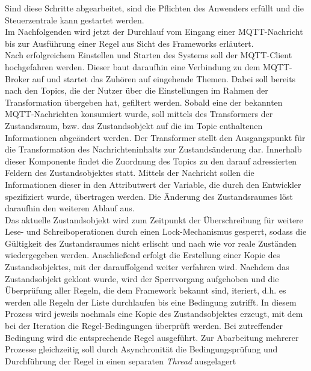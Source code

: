         Sind diese Schritte abgearbeitet, sind die Pflichten des Anwenders erfüllt und die Steuerzentrale kann gestartet werden. 
        \\
        Im Nachfolgenden wird jetzt der Durchlauf vom Eingang einer \acs{MQTT}-Nachricht bis zur Ausführung einer Regel aus Sicht des Frameworks 
        erläutert.
        \\
        \linebreak
        Nach erfolgreichem Einstellen und Starten des Systems soll der \acs{MQTT}-Client hochgefahren werden. Dieser baut daraufhin eine 
        Verbindung zu dem \acs{MQTT}-Broker auf und startet das Zuhören auf eingehende Themen. Dabei soll bereits nach den Topics,  
        die der Nutzer über die Einstellungen im Rahmen der Transformation übergeben hat, gefiltert werden. Sobald eine der bekannten 
        \acs{MQTT}-Nachrichten konsumiert wurde, soll mittels des Transformers der Zustandsraum, bzw. das Zustandsobjekt 
        auf die im Topic enthaltenen Informationen abgeändert werden. Der Transformer stellt den Ausgangspunkt für die Transformation 
        des Nachrichteninhalts zur Zustandsänderung dar. Innerhalb dieser Komponente findet die Zuordnung 
        des Topics zu den darauf adressierten Feldern des Zustandsobjektes statt. Mittels der Nachricht sollen die Informationen dieser 
        in den Attributwert der Variable, die durch den Entwickler spezifiziert wurde, übertragen werden. Die Änderung des 
        Zustandsraumes löst daraufhin den weiteren Ablauf aus. 
        \\
        Das aktuelle Zustandsobjekt wird zum Zeitpunkt der Überschreibung für weitere Lese- und Schreiboperationen durch einen Lock-Mechanismus gesperrt, sodass 
        die Gültigkeit des Zustandsraumes nicht erlischt und nach wie vor reale Zuständen wiedergegeben werden. Anschließend erfolgt die 
        Erstellung einer Kopie des Zustandsobjektes, mit der 
        darauffolgend weiter verfahren wird. Nachdem das Zustandsobjekt geklont wurde, wird der Sperrvorgang aufgehoben und die 
        Überprüfung aller Regeln, die dem Framework bekannt sind, iteriert, d.h. es werden alle Regeln der Liste durchlaufen bis eine Bedingung zutrifft. In diesem Prozess 
        wird jeweils nochmals eine Kopie des Zustandsobjektes erzeugt, mit dem bei der Iteration die Regel-Bedingungen überprüft werden. 
        Bei zutreffender Bedingung wird die entsprechende Regel ausgeführt. Zur Abarbeitung mehrerer Prozesse 
        gleichzeitig soll durch Asynchronität die Bedingungsprüfung und Durchführung der Regel in einen separaten \textit{Thread} ausgelagert 
